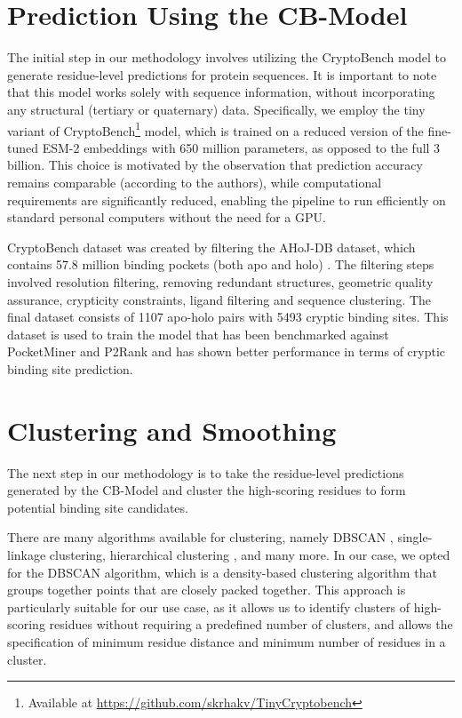 \section{Prediction Using the CB-Model}
\label{sec:prediction}

The initial step in our methodology involves utilizing the CryptoBench \cite{vskrhak2025cryptobench} model to generate residue-level predictions for protein sequences. It is important to note that this model works solely with sequence information, without incorporating any structural (tertiary or quaternary) data. Specifically, we employ the tiny variant of CryptoBench\footnote{Available at \url{https://github.com/skrhakv/TinyCryptobench}} model, which is trained on a reduced version of the fine-tuned ESM-2 embeddings \cite{lin2022language} with 650 million parameters, as opposed to the full 3 billion. This choice is motivated by the observation that prediction accuracy remains comparable (according to the authors), while computational requirements are significantly reduced, enabling the pipeline to run efficiently on standard personal computers without the need for a GPU.

CryptoBench dataset was created by filtering the AHoJ-DB \cite{feidakis2024ahoj} dataset, which contains 57.8 million binding pockets (both apo and holo) \cite{apoholo-stats}. The filtering steps involved resolution filtering, removing redundant structures, geometric quality assurance, crypticity constraints, ligand filtering and sequence clustering. The final dataset consists of 1107 apo-holo pairs with 5493 cryptic binding sites. This dataset is used to train the model that has been benchmarked against PocketMiner \cite{meller2023predicting} and P2Rank \cite{krivak2018p2rank} and has shown better performance in terms of cryptic binding site prediction.


\section{Clustering and Smoothing}
\label{sec:clustering}

The next step in our methodology is to take the residue-level predictions generated by the CB-Model and cluster the high-scoring residues to form potential binding site candidates.

There are many algorithms available for clustering, namely DBSCAN \cite{schubert2017dbscan}, single-linkage clustering, hierarchical clustering \cite{jarman2020hierarchical}, and many more. In our case, we opted for the DBSCAN algorithm, which is a density-based clustering algorithm that groups together points that are closely packed together. This approach is particularly suitable for our use case, as it allows us to identify clusters of high-scoring residues without requiring a predefined number of clusters, and allows the specification of minimum residue distance and minimum number of residues in a cluster.


